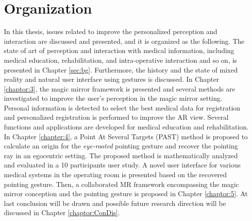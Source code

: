 \section{Organization}
In this thesis, issues related to improve the personalized perception and interaction are discussed and presented, and it is organized as the following. 
The state of art of perception and interaction with medical information, including medical education, rehabilitation, and intra-operative interaction and so on, is presented in Chapter \ref{sec:bg}. Furthermore, the history and the state of mixed reality and natural user interface using gestures is discussed.
In Chapter \ref{chaptor:3}, the magic mirror framework is presented and several methods are investigated to improve the user's perception in the magic mirror setting. Personal information is detected to select the best medical data for registration and personalized registration is performed to improve the AR view.  Several functions and applications are developed for medical education and rehabilitation.
In Chapter \ref{chapter:4}, a Point At Several Targets (PAST) method is proposed to calculate an origin for the \textit{eye-rooted} pointing gesture and recover the pointing ray in an egocentric setting. The proposed method is mathematically analyzed and evaluated in a 10 participants user study. A novel user interface for various medical systems in the operating room is presented based on the recovered pointing gesture. 
Then, a collaborated MR framework encompassing the magic mirror conception and the pointing gesture is proposed in Chapter \ref{chaptor:5}. 
At last conclusion will be drawn and possible future research direction will be discussed in Chapter \ref{chaptor:ConDis}.